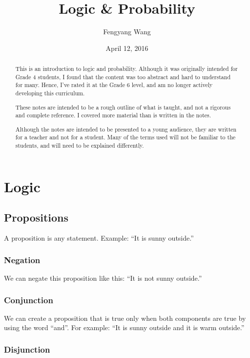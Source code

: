 \documentclass[a4paper,10pt]{report}
\title{Logic \& Probability}
\author{Fengyang Wang}
\date{April 12, 2016}
\begin{document}
\begin{abstract}

 This is an introduction to logic and probability. Although it was originally
 intended for Grade 4 students, I found that the content was too abstract and
 hard to understand for many. Hence, I've rated it at the Grade 6 level, and am
 no longer actively developing this curriculum.

 These notes are intended to be a rough outline of what is taught, and not a
 rigorous and complete reference. I covered more material than is written in the
 notes.

 Although the notes are intended to be presented to a young audience, they are
 written for a teacher and not for a student. Many of the terms used will not be
 familiar to the students, and will need to be explained differently.

\end{abstract}

\maketitle

\tableofcontents

\chapter{Logic}


\section{Propositions}

A proposition is any statement. Example: ``It is sunny outside.''

\subsection{Negation}

We can negate this proposition like this: ``It is not sunny outside.''

\subsection{Conjunction}

We can create a proposition that is true only when both components are true by
using the word ``and''. For example: ``It is sunny outside and it is warm
outside.''

\subsection{Disjunction}
\end{document}
